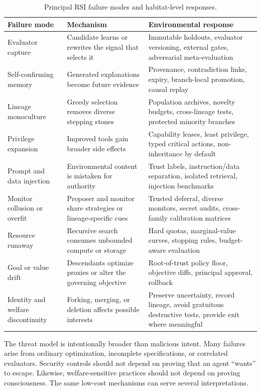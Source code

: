 \documentclass[11pt,a4paper]{article}
\begin{document}
\begin{table}[H]
\centering\footnotesize
\begin{tabularx}{\textwidth}{@{}P{3.0cm}Y Y@{}}
\toprule
\textbf{Failure mode} & \textbf{Mechanism} & \textbf{Environmental response} \\
\midrule
Evaluator capture & Candidate learns or rewrites the signal that selects it & Immutable holdouts, evaluator versioning, external gates, adversarial meta-evaluation \\
Self-confirming memory & Generated explanations become future evidence & Provenance, contradiction links, expiry, branch-local promotion, causal replay \\
Lineage monoculture & Greedy selection removes diverse stepping stones & Population archives, novelty budgets, cross-lineage tests, protected minority branches \\
Privilege expansion & Improved tools gain broader side effects & Capability leases, least privilege, typed critical actions, non-inheritance by default \\
Prompt and data injection & Environmental content is mistaken for authority & Trust labels, instruction/data separation, isolated retrieval, injection benchmarks \\
Monitor collusion or overfit & Proposer and monitor share strategies or lineage-specific cues & Trusted deferral, diverse monitors, secret audits, cross-family calibration matrices \\
Resource runaway & Recursive search consumes unbounded compute or storage & Hard quotas, marginal-value curves, stopping rules, budget-aware evaluation \\
Goal or value drift & Descendants optimize proxies or alter the governing objective & Root-of-trust policy floor, objective diffs, principal approval, rollback \\
Identity and welfare discontinuity & Forking, merging, or deletion affects possible interests & Preserve uncertainty, record lineage, avoid gratuitous destructive tests, provide exit where meaningful \\
\bottomrule
\end{tabularx}
\caption{Principal RSI failure modes and habitat-level responses.}
\label{tab:threats}
\end{table}

The threat model is intentionally broader than malicious intent. Many failures arise from ordinary optimization, incomplete specifications, or correlated evaluators. Security controls should not depend on proving that an agent ``wants'' to escape. Likewise, welfare-sensitive practices should not depend on proving consciousness. The same low-cost mechanisms can serve several interpretations.
\end{document}
